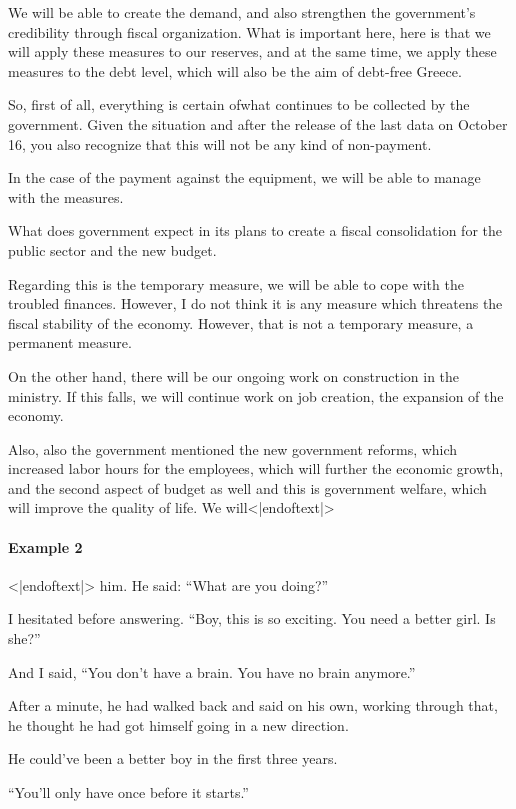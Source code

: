 \documentclass{article} %
\begin{document}
{\begin{appendices}
{We will be able to create the demand, and also strengthen the government's credibility through fiscal organization. What is important here, here is that we will apply these measures to our reserves, and at the same time, we apply these measures to the debt level, which will also be the aim of debt-free Greece.

So, first of all, everything is certain ofwhat continues to be collected by the government. Given the situation and after the release of the last data on October 16, you also recognize that this will not be any kind of non-payment.

In the case of the payment against the equipment, we will be able to manage with the measures.

What does government expect in its plans to create a fiscal consolidation for the public sector and the new budget.

Regarding this is the temporary measure, we will be able to cope with the troubled finances. However, I do not think it is any measure which threatens the fiscal stability of the economy. However, that is not a temporary measure, a permanent measure.

On the other hand, there will be our ongoing work on construction in the ministry. If this falls, we will continue work on job creation, the expansion of the economy.

Also, also the government mentioned the new government reforms, which increased labor hours for the employees, which will further the economic growth, and the second aspect of budget as well and this is government welfare, which will improve the quality of life. We will<|endoftext|>}

\paragraph{Example 2}
{\selectfont
<|endoftext|> him. He said: “What are you doing?”

I hesitated before answering. “Boy, this is so exciting. You need a better girl. Is she?”

And I said, “You don’t have a brain. You have no brain anymore.”

After a minute, he had walked back and said on his own, working through that, he thought he had got himself going in a new direction.

He could’ve been a better boy in the first three years.

“You’ll only have once before it starts.”

}
\end{appendices}}
\end{document}
